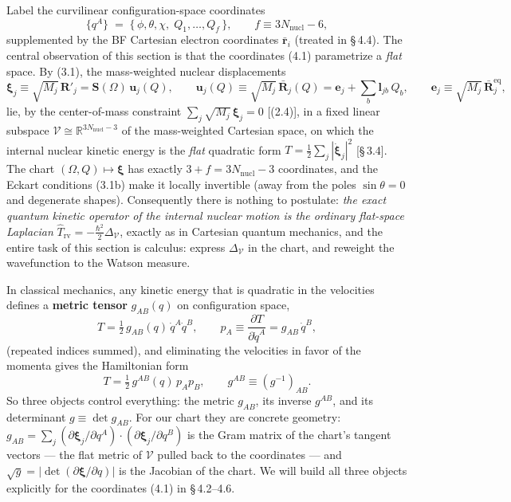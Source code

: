 Label the curvilinear configuration-space coordinates
\begin{equation}
\{q^{A}\}\;=\;\bigl\{\,\phi,\theta,\chi,\;Q_1,\dots,Q_f\,\bigr\},\qquad f\equiv 3N_{\mathrm{nucl}}-6, \tag{4.1}
\end{equation}
supplemented by the BF Cartesian electron coordinates $\bar{\mathbf{r}}_i$ (treated in \S\,4.4). The central observation of this section is that the coordinates (4.1) parametrize a \emph{flat} space. By (3.1), the mass-weighted nuclear displacements
\begin{equation*}
\boldsymbol\xi_j\equiv\sqrt{M_j}\,\mathbf R'_j=\mathbf S(\Omega)\,\mathbf u_j(Q),
\qquad
\mathbf u_j(Q)\equiv\sqrt{M_j}\,\bar{\mathbf R}_j(Q)=\mathbf e_j+\sum_b\mathbf l_{jb}\,Q_b,
\qquad
\mathbf e_j\equiv\sqrt{M_j}\,\bar{\mathbf R}^{\mathrm{eq}}_j,
\end{equation*}
lie, by the center-of-mass constraint $\sum_j\sqrt{M_j}\,\boldsymbol\xi_j=0$ [(2.4)], in a fixed linear subspace $\mathcal V\cong\mathbb R^{3N_{\mathrm{nucl}}-3}$ of the mass-weighted Cartesian space, on which the internal nuclear kinetic energy is the \emph{flat} quadratic form $T=\tfrac12\sum_j|\dot{\boldsymbol\xi}_j|^{2}$ [\S\,3.4]. The chart $(\Omega,Q)\mapsto\boldsymbol\xi$ has exactly $3+f=3N_{\mathrm{nucl}}-3$ coordinates, and the Eckart conditions (3.1b) make it locally invertible (away from the poles $\sin\theta=0$ and degenerate shapes). Consequently there is nothing to postulate: \emph{the exact quantum kinetic operator of the internal nuclear motion is the ordinary flat-space Laplacian} $\hat T_{\mathrm{rv}}=-\tfrac{\hbar^{2}}{2}\Delta_{\mathcal V}$, exactly as in Cartesian quantum mechanics, and the entire task of this section is calculus: express $\Delta_{\mathcal V}$ in the chart, and reweight the wavefunction to the Watson measure.

In classical mechanics, any kinetic energy that is quadratic in the velocities defines a \textbf{metric tensor} $g_{AB}(q)$ on configuration space,
\begin{equation}
T=\tfrac12\,g_{AB}(q)\,\dot q^{A}\dot q^{B},\qquad
p_A\equiv\frac{\partial T}{\partial\dot q^{A}}=g_{AB}\,\dot q^{B}, \tag{4.2}
\end{equation}
(repeated indices summed), and eliminating the velocities in favor of the momenta gives the Hamiltonian form
\begin{equation}
T=\tfrac12\,g^{AB}(q)\,p_A p_B ,\qquad g^{AB}\equiv (g^{-1})_{AB}. \tag{4.3}
\end{equation}
So three objects control everything: the metric $g_{AB}$, its inverse $g^{AB}$, and its determinant $g\equiv\det g_{AB}$. For our chart they are concrete geometry: $g_{AB}=\sum_j(\partial\boldsymbol\xi_j/\partial q^A)\!\cdot\!(\partial\boldsymbol\xi_j/\partial q^B)$ is the Gram matrix of the chart's tangent vectors --- the flat metric of $\mathcal V$ pulled back to the coordinates --- and $\sqrt g=|\det(\partial\boldsymbol\xi/\partial q)|$ is the Jacobian of the chart. We will build all three objects explicitly for the coordinates (4.1) in \S\,4.2--4.6.


